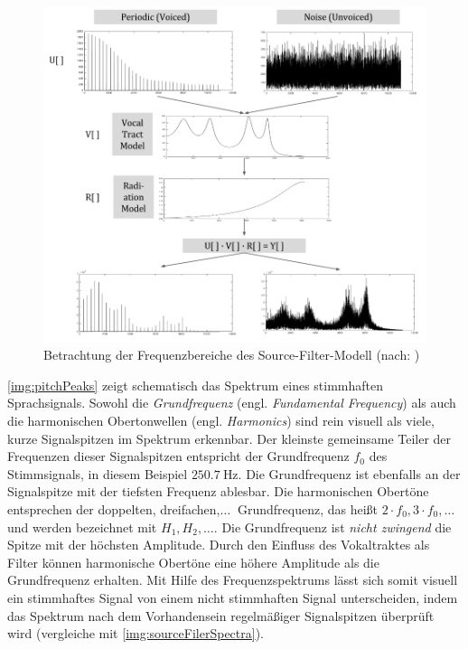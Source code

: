 \begin{figure}[h]
	\centering
	\includegraphics[width=1\textwidth]{bilder/sourceFilterSpectra.png}
	\caption[Betrachtung der Frequenzbereiche des Source-Filter-Modell]{Betrachtung der Frequenzbereiche des Source-Filter-Modell (nach: \cite[\emph{Source Estimation}, S. 3]{ricardo_ceps})}
	\label{img:sourceFilerSpectra}
\end{figure}	

\autoref{img:pitchPeaks} zeigt schematisch das Spektrum eines stimmhaften Sprachsignals. Sowohl die \emph{Grundfrequenz} (engl. \emph{Fundamental Frequency}) als auch die harmonischen Obertonwellen (engl. \emph{Harmonics}) sind rein visuell als \glqq viele, kurze Signalspitzen\grqq{} im Spektrum erkennbar. Der kleinste gemeinsame Teiler der Frequenzen dieser Signalspitzen entspricht der Grundfrequenz $f_0$ des Stimmsignals, in diesem Beispiel $\SI{250.7}{\hertz}$. Die Grundfrequenz ist ebenfalls an der Signalspitze mit der tiefsten Frequenz ablesbar. Die harmonischen Obertöne entsprechen der doppelten, dreifachen,$\ldots\ $ Grundfrequenz, das heißt $2\cdot f_0, 3\cdot f_0, \ldots$ und werden bezeichnet mit $H_1, H_2, \ldots$. Die Grundfrequenz ist \emph{nicht zwingend} die Spitze mit der höchsten Amplitude. Durch den Einfluss des Vokaltraktes als Filter können harmonische Obertöne eine höhere Amplitude als die Grundfrequenz erhalten. Mit Hilfe des Frequenzspektrums lässt sich somit visuell ein stimmhaftes Signal von einem nicht stimmhaften Signal unterscheiden, indem das Spektrum nach dem Vorhandensein regelmäßiger Signalspitzen überprüft wird (vergleiche mit \autoref{img:sourceFilerSpectra}).\cite[S. 52 - 53]{sprachverarbeitung}

